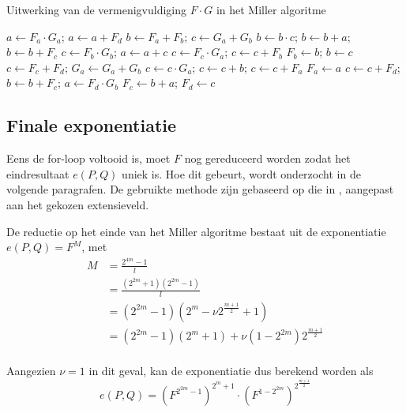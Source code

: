 \begin{algorithm}[h]
	\caption{Uitwerking van de vermenigvuldiging $F \cdot G$ in het Miller algoritme}
	\label{algoritme-implementatie-miller-fg}
	$a \leftarrow F_a \cdot G_a$; $a \leftarrow a + F_d$\;
	$b \leftarrow F_a + F_b$; $c \leftarrow G_a + G_b$\;
	$b \leftarrow b \cdot c$; $b \leftarrow b + a$; $b \leftarrow b + F_c$\;
	$c \leftarrow F_b \cdot G_b$; $a \leftarrow a + c$\;
	$c \leftarrow F_c \cdot G_a$;	$c \leftarrow c + F_b$\;
	$F_b \leftarrow b$; $b \leftarrow c$\;
	$c \leftarrow F_c + F_d$; $G_a \leftarrow G_a + G_b$\;
	$c \leftarrow c \cdot G_a$; $c \leftarrow c + b$; $c \leftarrow c + F_a$\;
	$F_a \leftarrow a$\;
	$c \leftarrow c + F_d$; $b \leftarrow b + F_c$; $a \leftarrow F_d \cdot G_b$\;
	$F_c \leftarrow b + a$; $F_d \leftarrow c$\;
\end{algorithm}

\subsection{Finale exponentiatie}\label{subsectie-implementatie-miller-finale-exp}

Eens de for-loop voltooid is, moet $F$ nog gereduceerd worden zodat het eindresultaat $e(P, Q)$ uniek is. Hoe dit gebeurt, wordt onderzocht in de volgende paragrafen. De gebruikte methode zijn gebaseerd op die in \cite{beuchat}, aangepast aan het gekozen extensieveld.

De reductie op het einde van het Miller algoritme bestaat uit de exponentiatie $e(P, Q) = F^M$, met
\[\begin{aligned}
M	&= \frac{2^{4m} - 1}{l}\\
	&= \frac{(2^{2m} + 1)(2^{2m} - 1)}{l}\\
	&= (2^{2m} - 1)(2^m - \nu 2^{\frac{m + 1}{2}} + 1)\\
	&= (2^{2m} - 1)(2^m + 1) + \nu(1 - 2^{2m})2^{\frac{m + 1}{2}}\\
\end{aligned}\]

Aangezien $\nu = 1$ in dit geval, kan de exponentiatie dus berekend worden als
\[e(P, Q) = \left(F^{2^{2m} - 1}\right)^{2^m + 1} \cdot \left(F^{1 - 2^{2m}}\right)^{2^{\frac{m + 1}{2}}}\]

